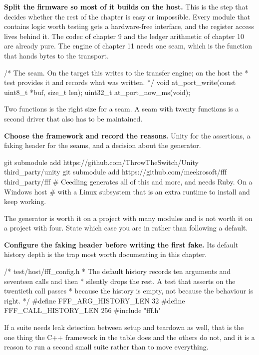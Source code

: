 \begin{steps}
\item \textbf{Split the firmware so most of it builds on the host.} This is the
step that decides whether the rest of the chapter is easy or impossible. Every
module that contains logic worth testing gets a hardware-free interface, and the
register access lives behind it. The codec of chapter 9 and the ledger
arithmetic of chapter 10 are already pure. The engine of chapter 11 needs one
seam, which is the function that hands bytes to the transport.
\begin{ccode}
/* The seam. On the target this writes to the transfer engine; on the host the
 * test provides it and records what was written.                           */
void at_port_write(const uint8_t *buf, size_t len);
uint32_t at_port_now_ms(void);
\end{ccode}
Two functions is the right size for a seam. A seam with twenty functions is a
second driver that also has to be maintained.

\item \textbf{Choose the framework and record the reasons.} Unity for the
assertions, a faking header for the seams, and a decision about the generator.
\begin{shellcode}
git submodule add https://github.com/ThrowTheSwitch/Unity third_party/unity
git submodule add https://github.com/meekrosoft/fff  third_party/fff
# Ceedling generates all of this and more, and needs Ruby. On a Windows host
# with a Linux subsystem that is an extra runtime to install and keep working.
\end{shellcode}
The generator is worth it on a project with many modules and is not worth it on
a project with four. State which case you are in rather than following a
default.

\item \textbf{Configure the faking header before writing the first fake.} Its
default history depth is the trap most worth documenting in this chapter.
\begin{ccode}
/* test/host/fff_config.h
 * The default history records ten arguments and seventeen calls and then
 * silently drops the rest. A test that asserts on the twentieth call passes
 * because the history is empty, not because the behaviour is right.        */
#define FFF_ARG_HISTORY_LEN   32
#define FFF_CALL_HISTORY_LEN  256
#include "fff.h"
\end{ccode}
If a suite needs leak detection between setup and teardown as well, that is the
one thing the C++ framework in the table does and the others do not, and it is a
reason to run a second small suite rather than to move everything.


\end{steps}
